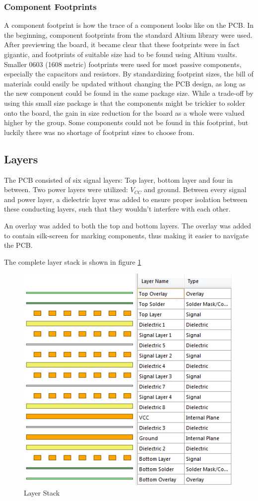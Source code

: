 \subsubsection{Component Footprints}
A component footprint is how the trace of a component looks like on the PCB.
In the beginning, component footprints from the standard Altium library were used.
After previewing the board, it became clear that these footprints were in fact gigantic, and footprints of suitable size had to be found using Altium vaults.
Smaller 0603 (1608 metric) footprints were used for most passive components, especially the capacitors and resistors.
By standardizing footprint sizes, the bill of materials could easily be updated without changing the PCB design, as long as the new component could be found in the same package size.
While a trade-off by using this small size package is that the components might be trickier to solder onto the board, the gain in size reduction for the board as a whole were valued higher by the group.
Some components could not be found in this footprint, but luckily there was no shortage of footprint sizes to choose from.

\subsection{Layers}
The PCB consisted of six signal layers: Top layer, bottom layer and four in between.
Two power layers were utilized: \(V_{CC}\) and ground.
Between every signal and power layer, a dielectric layer was added to ensure proper isolation between these conducting layers, such that they wouldn't interfere with each other.

An overlay was added to both the top and bottom layers.
The overlay was added to contain silk-screen for marking components, thus making it easier to navigate the PCB.

The complete layer stack is shown in figure \ref{fig:Layers}

\begin{figure}[h!]
\centering
\includegraphics[scale = 0.8]{images/Layers.png}
\caption{Layer Stack}
\label{fig:Layers}
\end{figure}

